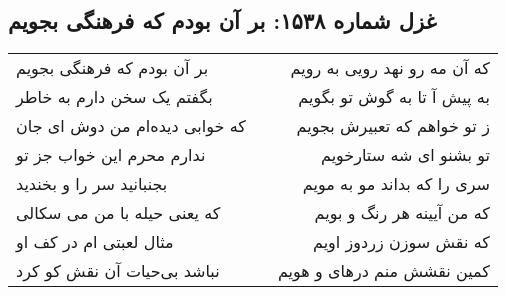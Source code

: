 \begin{center}
\section*{غزل شماره ۱۵۳۸: بر آن بودم که فرهنگی بجویم}
\label{sec:1538}
\begin{longtable}{l p{0.5cm} r}
بر آن بودم که فرهنگی بجویم
&&
که آن مه رو نهد رویی به رویم
\\
بگفتم یک سخن دارم به خاطر
&&
به پیش آ تا به گوش تو بگویم
\\
که خوابی دیده‌ام من دوش ای جان
&&
ز تو خواهم که تعبیرش بجویم
\\
ندارم محرم این خواب جز تو
&&
تو بشنو ای شه ستارخویم
\\
بجنبانید سر را و بخندید
&&
سری را که بداند مو به مویم
\\
که یعنی حیله با من می سکالی
&&
که من آیینه هر رنگ و بویم
\\
مثال لعبتی ام در کف او
&&
که نقش سوزن زردوز اویم
\\
نباشد بی‌حیات آن نقش کو کرد
&&
کمین نقشش منم درهای و هویم
\\
\end{longtable}
\end{center}
